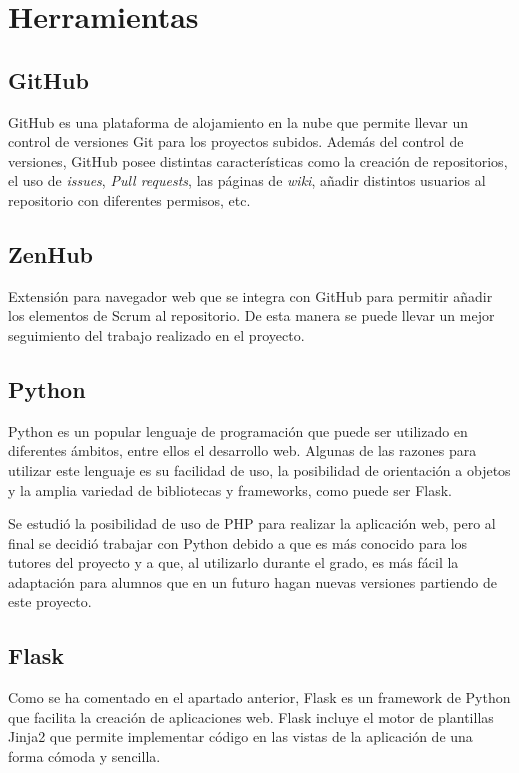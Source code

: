 \section{Herramientas}
\subsection{GitHub}
GitHub es una plataforma de alojamiento en la nube que permite llevar un control de versiones Git para los proyectos subidos. Además del control de versiones, GitHub posee distintas características como la creación de repositorios, el uso de \textit{issues}, \textit{Pull requests}, las páginas de \textit{wiki}, añadir distintos usuarios al repositorio con diferentes permisos, etc.\cite{wiki:github}

\subsection{ZenHub}
Extensión para navegador web que se integra con GitHub para permitir añadir los elementos de Scrum al repositorio. De esta manera se puede llevar un mejor seguimiento del trabajo realizado en el proyecto.

\subsection{Python}
Python es un popular lenguaje de programación que puede ser utilizado en diferentes ámbitos, entre ellos el desarrollo web. Algunas de las razones para utilizar este lenguaje es su facilidad de uso, la posibilidad de orientación a objetos y la amplia variedad de bibliotecas y frameworks, como puede ser Flask.\cite{python}

Se estudió la posibilidad de uso de PHP para realizar la aplicación web, pero al final se decidió trabajar con Python debido a que es más conocido para los tutores del proyecto y a que, al utilizarlo durante el grado, es más fácil la adaptación para alumnos que en un futuro hagan nuevas versiones partiendo de este proyecto.

\subsection{Flask}
Como se ha comentado en el apartado anterior, Flask es un framework de Python que facilita la creación de aplicaciones web. Flask incluye el motor de plantillas Jinja2 que permite implementar código en las vistas de la aplicación de una forma cómoda y sencilla.

